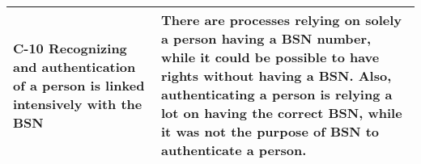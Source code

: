 \begin{tabular}{ |p{5cm}||p{11cm}|}
\hline
C-10 Recognizing and authentication of a person is linked intensively with the BSN & There are processes relying on solely a person having a BSN number, while it could be possible to have rights without having a BSN. Also, authenticating a person is relying a lot on having the correct BSN, while it was not the purpose of BSN to authenticate a person.
 \\
\hline
\end{tabular}




